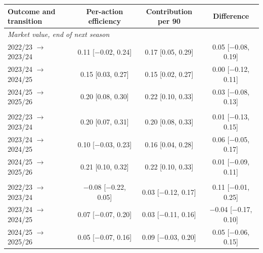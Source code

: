 \begin{tabular}{lccc}
\toprule
Outcome and transition & Per-action efficiency & Contribution per 90 & Difference \\
\midrule
\multicolumn{4}{l}{\textit{Market value, end of next season}} \\
2022/23 $\to$ 2023/24 & 0.11 [$-$0.02, 0.24] & 0.17 [0.05, 0.29] & 0.05 [$-$0.08, 0.19] \\
2023/24 $\to$ 2024/25 & 0.15 [0.03, 0.27] & 0.15 [0.02, 0.27] & 0.00 [$-$0.12, 0.11] \\
2024/25 $\to$ 2025/26 & 0.20 [0.08, 0.30] & 0.22 [0.10, 0.33] & 0.03 [$-$0.08, 0.13] \\
\addlinespace
\multicolumn{4}{l}{\textit{Market value, end of same season}} \\
2022/23 $\to$ 2023/24 & 0.20 [0.07, 0.31] & 0.20 [0.08, 0.33] & 0.01 [$-$0.13, 0.15] \\
2023/24 $\to$ 2024/25 & 0.10 [$-$0.03, 0.23] & 0.16 [0.04, 0.28] & 0.06 [$-$0.05, 0.17] \\
2024/25 $\to$ 2025/26 & 0.21 [0.10, 0.32] & 0.22 [0.10, 0.33] & 0.01 [$-$0.09, 0.11] \\
\addlinespace
\multicolumn{4}{l}{\textit{Change in market value}} \\
2022/23 $\to$ 2023/24 & $-$0.08 [$-$0.22, 0.05] & 0.03 [$-$0.12, 0.17] & 0.11 [$-$0.01, 0.25] \\
2023/24 $\to$ 2024/25 & 0.07 [$-$0.07, 0.20] & 0.03 [$-$0.11, 0.16] & $-$0.04 [$-$0.17, 0.10] \\
2024/25 $\to$ 2025/26 & 0.05 [$-$0.07, 0.16] & 0.09 [$-$0.03, 0.20] & 0.05 [$-$0.06, 0.15] \\
\bottomrule
\end{tabular}
